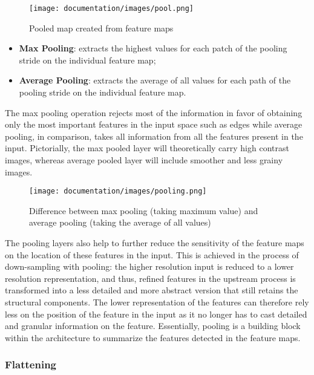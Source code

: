 \documentclass[solid,math,chem,code,plot,gloss]{bmc}
\begin{document}
\begin{figure}[hbt!]
    \centering
    \texttt{[image: documentation/images/pool.png]}
    \caption{Pooled map created from feature maps}
    \label{fig:filters}
\end{figure}

\begin{itemize}
    \item \textbf{Max Pooling}: extracts the highest values for each patch of the pooling stride on the individual feature map;  
    \item \textbf{Average Pooling}: extracts the average of all values for each path of the pooling stride on the individual feature map.
\end{itemize}

The max pooling operation rejects most of the information in favor of obtaining only the most important features in the input space such as edges while average pooling, in comparison, takes all information from all the features present in the input. Pictorially, the max pooled layer will theoretically carry high contrast images, whereas average pooled layer will include smoother and less grainy images.

\begin{figure}[hbt!]
    \centering
    \texttt{[image: documentation/images/pooling.png]}
    \caption{Difference between max pooling (taking maximum value) and average pooling (taking the average of all values)}
    \label{fig:maxpool}
\end{figure}

The pooling layers also help to further reduce the sensitivity of the feature maps on the location of these features in the input. This is achieved in the process of down-sampling with pooling: the higher resolution input is reduced to a lower resolution representation, and thus, refined features in the upstream process is transformed into a less detailed and more abstract version that still retains the structural components. The lower representation of the features can therefore rely less on the position of the feature in the input as it no longer has to cast detailed and granular information on the feature. Essentially, pooling is a building block within the architecture to summarize the features detected in the feature maps.  

\subsubsection{Flattening}
\end{document}
